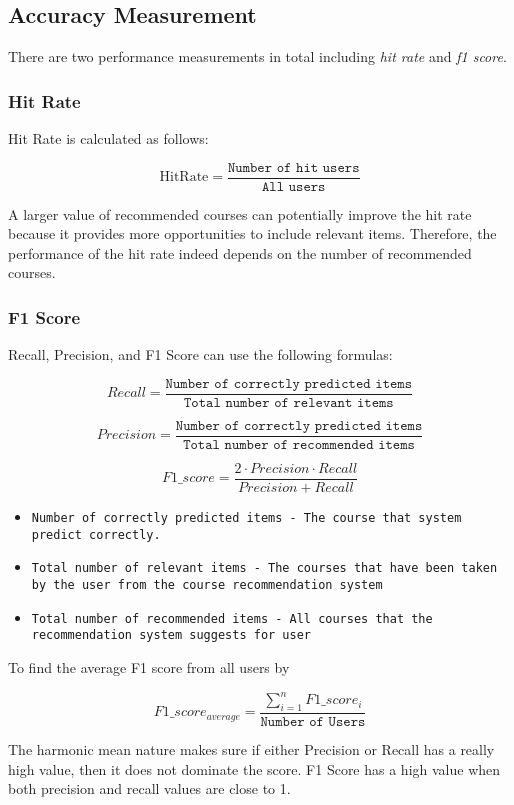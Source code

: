 \subsection{Accuracy Measurement}
There are two performance measurements in total including \textit{hit rate} and \textit{f1 score}.

\subsubsection{Hit Rate}
Hit Rate is calculated as follows:

\begin{equation}
    \text{HitRate} = \frac{\texttt{Number of hit users}}{\texttt{All users}}
\end{equation}

\noindent A larger value of recommended courses can potentially improve the hit rate because it provides more opportunities to include relevant items. Therefore, the performance of the hit rate indeed depends on the number of recommended courses.


\subsubsection{F1 Score}

Recall, Precision, and F1 Score can use the following formulas:

\begin{equation}
    Recall = \frac{\texttt{Number of correctly predicted items}}{\texttt{Total number of relevant items}}
\end{equation}

\begin{equation}
    Precision = \frac{\texttt{Number of correctly predicted items}}{\texttt{Total number of recommended items}}
\end{equation}

\begin{equation}
    F1\_score = \frac{2⋅Precision⋅Recall}{Precision+Recall}
\end{equation}

\begin{itemize}
    \item \texttt{Number of correctly predicted items - The course that system predict correctly.}
    \item \texttt{Total number of relevant items - The courses that have been taken by the user from the course recommendation system}
    \item \texttt{Total number of recommended items - All courses that the recommendation system suggests for user}
\end{itemize}

\noindent To find the average F1 score from all users by

\begin{equation}
    \text{$F1\_score_{average}$} = \frac{\sum_{i=1}^{n}F1\_score_{i}}{\texttt{Number of Users}}
\end{equation}

\noindent The harmonic mean nature makes sure if either Precision or Recall has a really high value, then it does not dominate the score. F1 Score has a high value when both precision and recall values are close to 1.